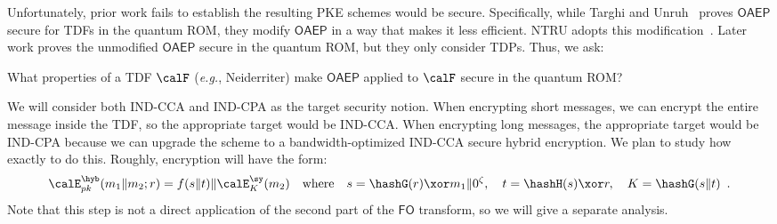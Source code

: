 {\begin{itemize}
Unfortunately, prior work fails to establish the resulting PKE schemes would be secure.
Specifically, while Targhi and Unruh~\cite{}  proves $\mathsf{OAEP}$ secure for TDFs in the quantum ROM, they modify $\mathsf{OAEP}$ in a way that makes it less  efficient. NTRU adopts this modification~\cite{}. 
Later work proves the unmodified $\mathsf{OAEP}$ secure in the quantum ROM,  but they only consider TDPs. Thus, we ask:
\begin{ques}
    What properties of a TDF $\calF$ (\emph{e.g.}, Neiderriter) make $\mathsf{OAEP}$ applied to $\calF$ secure in the quantum ROM?
\end{ques} 
We will consider both IND-CCA and IND-CPA as the target security notion. When encrypting short messages, we can encrypt the entire message inside the TDF, so the appropriate target would be IND-CCA.  When encrypting long messages, the appropriate target  would be IND-CPA because we can upgrade the scheme to a bandwidth-optimized IND-CCA secure hybrid encryption. We plan to study how exactly to do this. Roughly, encryption will  have the form:
\[
\calE^{\hyb}_{pk}(m_1\|m_2;r) = 
f(s \| t) \| \calE^{\sy}_{K}(m_2) 
\quad \mbox{where} \quad
  s = \hashG(r) \xor  m_1 \| 0^\zeta, \quad t = \hashH(s) \xor r, \quad K = \hashG(s \| t)
\enspace.
\]
Note that this step is not a direct application of the second part of the $\mathsf{FO}$ transform, so we will give a separate analysis. 






\end{itemize}}

